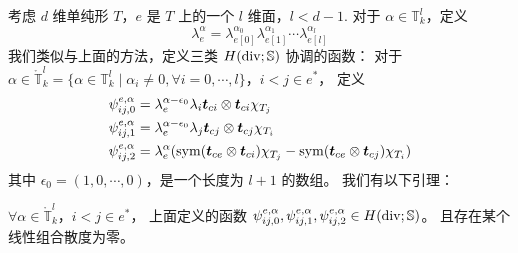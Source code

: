 \documentclass[letterpaper,12pt]{article}
\begin{document}
考虑 $d$ 维单纯形 $T$，$e$ 是 $T$ 上的一个 $l$ 维面，$l < d-1$. 
对于 $\alpha \in \mathbb{T}_k^{l}$，定义
$$
\lambda^{\alpha}_e = \lambda_{e[0]}^{\alpha_0} \lambda_{e[1]}^{\alpha_1}
\cdots \lambda_{e[l]}^{\alpha_l}
$$
我们类似与上面的方法，定义三类 $H(\operatorname{div}; \mathbb{S})$ 协调的函数：
对于 $\alpha \in \mathring{\mathbb{T}}_{k}^{l} = \{ \alpha \in \mathbb{T}_k^{l} \mid 
\alpha_i \not= 0, \forall i = 0, \cdots, l\}$，$i < j \in e^*$，
定义 
$$
\begin{aligned} 
    \psi_{ij, 0}^{e, \alpha} & = \lambda^{\alpha - \epsilon_0}_e\lambda_i
    \boldsymbol{t}_{ci} \otimes \boldsymbol{t}_{ci} \chi_{T_j}\\
    \psi_{ij, 1}^{e, \alpha} & = \lambda^{\alpha - \epsilon_0}_e\lambda_j
    \boldsymbol{t}_{cj} \otimes \boldsymbol{t}_{cj} \chi_{T_i}\\
    \psi_{ij, 2}^{e, \alpha} & = 
    \lambda_e^{\alpha}(\operatorname{sym}(\boldsymbol{t}_{ce} \otimes \boldsymbol{t}_{ci})\chi_{T_j} -
    \operatorname{sym}(\boldsymbol{t}_{ce} \otimes \boldsymbol{t}_{cj})\chi_{T_i})
\end{aligned}
$$
其中 $\epsilon_0 = (1, 0, \cdots, 0)$，是一个长度为 $l+1$ 的数组。
我们有以下引理：
\begin{lemma}
\label{lem:diver2}
$\forall \alpha \in \mathring{\mathbb{T}}_{k}^{l}$，$i < j \in e^*$，
上面定义的函数 $\psi_{ij, 0}^{e, \alpha}, \psi_{ij, 1}^{e, \alpha},
\psi_{ij, 2}^{e, \alpha} \in H(\operatorname{div}; \mathbb{S})$。
且存在某个线性组合散度为零。
\end{lemma}
\end{document}

